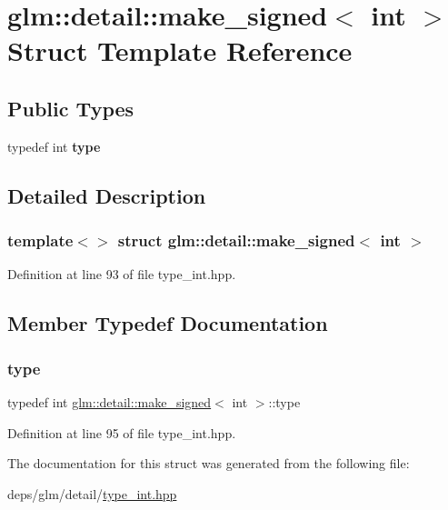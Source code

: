 \hypertarget{structglm_1_1detail_1_1make__signed_3_01int_01_4}{}\section{glm\+:\+:detail\+:\+:make\+\_\+signed$<$ int $>$ Struct Template Reference}
\label{structglm_1_1detail_1_1make__signed_3_01int_01_4}
\subsection*{Public Types}
\begin{DoxyCompactItemize}
\item 
\mbox{\label{structglm_1_1detail_1_1make__signed_3_01int_01_4_a69085e97a5044d1985cdc2116eb6ea9b}} 
typedef int {\bfseries type}
\end{DoxyCompactItemize}


\subsection{Detailed Description}
\subsubsection*{template$<$$>$\newline
struct glm\+::detail\+::make\+\_\+signed$<$ int $>$}



Definition at line 93 of file type\+\_\+int.\+hpp.



\subsection{Member Typedef Documentation}
\mbox{\label{structglm_1_1detail_1_1make__signed_3_01int_01_4_a69085e97a5044d1985cdc2116eb6ea9b}} 
\subsubsection{\texorpdfstring{type}{type}}
{\footnotesize\ttfamily typedef int \hyperlink{structglm_1_1detail_1_1make__signed}{glm\+::detail\+::make\+\_\+signed}$<$ int $>$\+::type}



Definition at line 95 of file type\+\_\+int.\+hpp.



The documentation for this struct was generated from the following file\+:\begin{DoxyCompactItemize}
\item 
deps/glm/detail/\hyperlink{type__int_8hpp}{type\+\_\+int.\+hpp}\end{DoxyCompactItemize}
